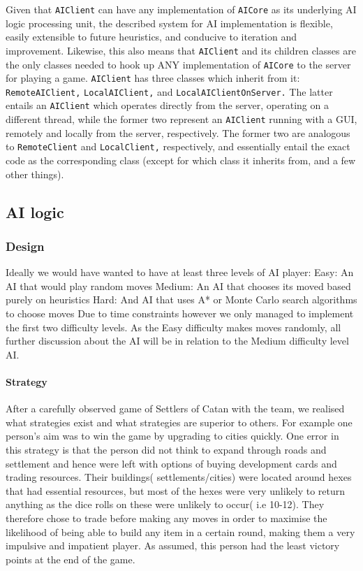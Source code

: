 \documentclass[a4paper,doc]{apa6}
\newcommand{\code}{\texttt}
\begin{document}
Given that \code{AIClient} can have any implementation of \code{AICore} as its underlying AI logic processing unit, the described system for AI implementation is flexible, easily extensible to future heuristics, and conducive to iteration and improvement. Likewise, this also means that \code{AIClient} and its children classes are the only classes needed to hook up ANY implementation of \code{AICore} to the server for playing a game. \code{AIClient} has three classes which inherit from it: \code{RemoteAIClient,} \code{LocalAIClient,} and \code{LocalAIClientOnServer.} The latter entails an \code{AIClient} which operates directly from the server, operating on a different thread, while the former two represent an \code{AIClient} running with a GUI, remotely and locally from the server, respectively. The former two are analogous to \code{RemoteClient} and \code{LocalClient,} respectively, and essentially entail the exact code as the corresponding class (except for which class it inherits from, and a few other things).


\subsection{AI logic}
\subsubsection{Design}
Ideally we would have wanted to have at least three levels of AI player:
Easy: An AI that would play random moves
Medium: An AI that chooses its moved based purely on heuristics
Hard: And AI that uses A* or Monte Carlo search algorithms to choose moves
Due to time constraints however we only managed to implement the first two difficulty levels. As the Easy difficulty makes moves randomly, all further discussion about the AI will be in relation to the Medium difficulty level AI.

\paragraph{Strategy}
After a carefully observed game of Settlers of Catan with the team, we realised what strategies exist and what strategies are superior to others. For example one person’s aim was to win the game by upgrading to cities quickly. One error in this strategy is that the person did not think to expand through roads and settlement and hence were left with options of buying development cards and trading resources. Their buildings( settlements/cities) were located around hexes that had essential resources, but most of the hexes were very unlikely to return anything as the dice rolls on these were unlikely to occur( i.e 10-12). They therefore chose to trade before making any moves in order to maximise the likelihood of being able to build any item in a certain round, making them a very impulsive and impatient player. As assumed, this person had the least victory points at the end of the game. 
\end{document}

